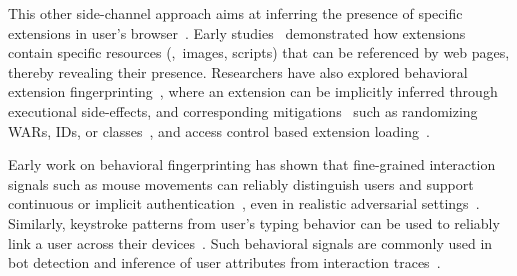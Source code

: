 %
This other side-channel approach aims at inferring the presence of specific extensions in user's browser~\cite{karamiCarnusExploringPrivacy2020}. 
%
Early studies~\cite{sjostenDiscoveringBrowserExtensions2017, gulyasExtendNotExtend2018, karamiCarnusExploringPrivacy2020} demonstrated how extensions contain specific resources (\eg{},~images, scripts) that can be referenced by web pages, thereby revealing their presence. 
%
Researchers have also explored behavioral extension fingerprinting~\cite{starovXHOUNDQuantifyingFingerprintability2017, karamiCarnusExploringPrivacy2020, solomosDangersHumanTouch2022, solomosEscapingConfinesTime2022, laperdrixFingerprintingStyleDetecting2021, agarwalPeekingWindowFingerprinting2024}, where an extension can be implicitly inferred through executional side-effects, and corresponding mitigations~\cite{karamiUnleashSimulacrumShifting2022, sanchez-rolaExtensionBreakdownSecurity2017} such as randomizing WARs, IDs, or classes~\cite{trickelEveryoneDifferentClientside2019}, and access control based extension loading~\cite{sjostenLatexGlovesProtecting2019}. 


%
%
Early work on behavioral fingerprinting has shown that fine-grained interaction signals such as mouse movements can reliably distinguish users and support continuous or implicit authentication~\cite{zhengEfficientUserVerification2011,jorgensenMouseDynamicsBehavioral2011}, even in realistic adversarial settings~\cite{fereidooniAuthentiSenseScalableBehavioral2023}. 
%
Similarly, keystroke patterns from user's typing behavior can be used to reliably link a user across their devices~\cite{yuanCrossdeviceTrackingIdentification2018}.
%
Such behavioral signals are commonly used in bot detection and inference of user attributes from interaction traces~\cite{leivaMyMouseMy2021}. 


